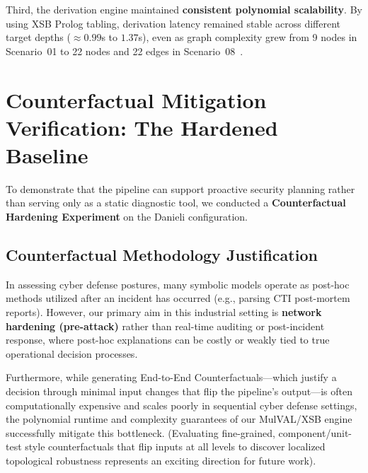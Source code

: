 \documentclass[target=mst,aauheader=aics,style=]{thud}
\begin{document}
Third, the derivation engine maintained \textbf{consistent polynomial scalability}. By using XSB Prolog tabling, derivation latency remained stable across different target depths ($\approx 0.99$s to $1.37$s), even as graph complexity grew from 9 nodes in Scenario~01 to 22 nodes and 22 edges in Scenario~08~\cite{swift2012xsb}.

\section{Counterfactual Mitigation Verification: The Hardened Baseline}
\label{sec:counterfactual_verification}

To demonstrate that the pipeline can support proactive security planning rather than serving only as a static diagnostic tool, we conducted a \textbf{Counterfactual Hardening Experiment} on the Danieli configuration.

\subsection{Counterfactual Methodology Justification}
In assessing cyber defense postures, many symbolic models operate as post-hoc methods utilized after an incident has occurred (e.g., parsing CTI post-mortem reports). However, our primary aim in this industrial setting is \textbf{network hardening (pre-attack)} rather than real-time auditing or post-incident response, where post-hoc explanations can be costly or weakly tied to true operational decision processes. 

Furthermore, while generating End-to-End Counterfactuals---which justify a decision through minimal input changes that flip the pipeline's output---is often computationally expensive and scales poorly in sequential cyber defense settings, the polynomial runtime and complexity guarantees of our MulVAL/XSB engine successfully mitigate this bottleneck. (Evaluating fine-grained, component/unit-test style counterfactuals that flip inputs at all levels to discover localized topological robustness represents an exciting direction for future work).
\end{document}
